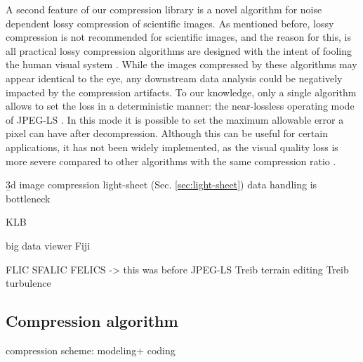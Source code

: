   A second feature of our compression library is a novel algorithm for noise dependent lossy compression of scientific images. As mentioned before, lossy compression is not recommended for scientific images, and the reason for this, is all practical lossy compression algorithms are designed with the intent of fooling the human visual system \cite{sayood_introduction_2012}. While the images compressed by these algorithms may appear identical to the eye, any downstream data analysis could be negatively impacted by the compression artifacts. To our knowledge, only a single algorithm allows to set the loss in a deterministic manner: the near-lossless operating mode of JPEG-LS \cite{weinberger_loco-i_2000}. In this mode it is possible to set the maximum allowable error a pixel can have after decompression. Although this can be useful for certain applications, it has not been widely implemented, as the visual quality loss is more severe compared to other algorithms with the same compression ratio \cite{santa-cruz_study_2000}.

  \b3d image compression
  light-sheet (Sec. \ref{sec:light-sheet})
  data handling is bottleneck 

  KLB \cite{amat_efficient_2015}

  big data viewer \cite{pietzsch_bigdataviewer:_2015}
  Fiji \cite{schindelin_fiji:_2012}

  FLIC \cite{wang_fast_2012}
  SFALIC \cite{starosolski_simple_2007}
  FELICS \cite{howard_fast_1993} -> this was before JPEG-LS
  Treib terrain editing \cite{treib_interactive_2012}
  Treib turbulence \cite{treib_turbulence_2012}



    


    

  \subsection{Compression algorithm}

    compression scheme: modeling+ coding \cite{rissanen_universal_1981}

